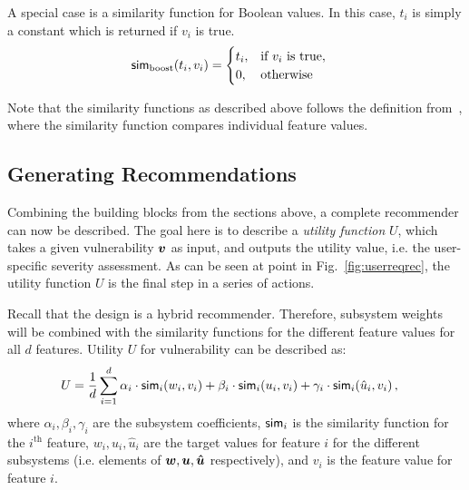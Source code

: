 {A special case is a similarity function for Boolean values. In this case, $t_i$ is simply a constant which is returned if $v_i$ is true.
\begin{align}
\mathsf{sim}_\text{boost}(t_i, v_i) &=
\begin{cases}
t_i, & \text{if } v_i \text{ is true}, \\
0, & \text{otherwise} \\
\end{cases}
\end{align}

Note that the similarity functions as described above follows the definition from~\cite{smyth:2007}, where the similarity function compares individual feature values.

\subsection{Generating Recommendations} \label{sec:generatingrecommendations}
Combining the building blocks from the sections above, a complete recommender can now be described.
The goal here is to describe a \emph{utility function} $U$, which takes a given vulnerability $\bm{v}$ as input, and outputs the utility value, i.e. the user-specific severity assessment.
As can be seen at point  in Fig.~\ref{fig:userreqrec}, the utility function $U$ is the final step in a series of actions.

Recall that the design is a hybrid recommender. Therefore, subsystem weights will be combined with the similarity functions for the different feature values for all $d$ features.
Utility $U$ for vulnerability can be described as:
\begin{align}
U &= \frac{1}{d} \sum_{i=1}^d \alpha_i \cdot \mathsf{sim}_i(w_i, v_i) + \beta_i \cdot \mathsf{sim}_i(u_i, v_i) + \gamma_i \cdot \mathsf{sim}_i(\hat{u}_i, v_i) \,,
\end{align}
where $\alpha_i, \beta_i, \gamma_i$ are the subsystem coefficients, $\mathsf{sim}_i$ is the similarity function for the $i^\text{th}$ feature, $w_i, u_i, \hat{u}_i$ are the target values for feature $i$ for the different subsystems (i.e. elements of $\bm{w}, \bm{u}, \bm{\hat{u}}$ respectively), and $v_i$ is the feature value for feature $i$.

}
